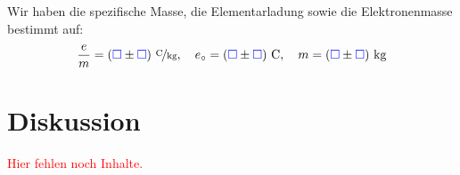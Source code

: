 \documentclass[11pt]{article}
\newcommand{\emesswert}{\left(\messwert \pm \messwert \right)}
\newcommand{\fehlt}{\textcolor{red}{Hier fehlen noch Inhalte.}}
\newcommand{\messwert}{\textcolor{blue}{\square}}
\begin{document}
Wir haben die spezifische Masse, die Elementarladung sowie die Elektronenmasse
bestimmt auf:
\[
	\frac em = \unitfrac[\emesswert]C{kg}
	, \quad
	e_\circ = \unit[\emesswert]C
	, \quad
	m = \unit[\emesswert]{kg}
\]



\section{Diskussion}

\fehlt
\end{document}
